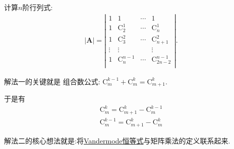 \documentclass[../../main.tex]{subfiles}%
\begin{document}
\begin{example}
计算$n$阶行列式:
\begin{align*}
|\boldsymbol{A}|=\left| \begin{matrix}
1&		1&		\cdots&		1\\
1&		\mathrm{C}_{2}^{1}&		\cdots&		\mathrm{C}_{n}^{1}\\
1&		\mathrm{C}_{3}^{2}&		\cdots&		\mathrm{C}_{n+1}^{2}\\
\vdots&		\vdots&		&		\vdots\\
1&		\mathrm{C}_{n}^{n-1}&		\cdots&		\mathrm{C}_{2n-2}^{n-1}\\
\end{matrix} \right|.
\end{align*}
\end{example}
\begin{note}
{\color{blue}解法一}的关键就是
组合数公式:
$\mathrm{C}_{m}^{k-1}+\mathrm{C}_{m}^{k}=\mathrm{C}_{m+1}^{k}$.

于是有
\begin{gather*}
\mathrm{C}_{m}^{k}=\mathrm{C}_{m+1}^{k}-\mathrm{C}_{m}^{k-1}
\\
\mathrm{C}_{m}^{k-1}=\mathrm{C}_{m+1}^{k}-\mathrm{C}_{m}^{k}
\end{gather*}

{\color{blue}解法二}的核心想法就是:将\hyperref[theorem:Vandermode恒等式]{Vandermode恒等式}与矩阵乘法的定义联系起来.
\end{note}
\end{document}
